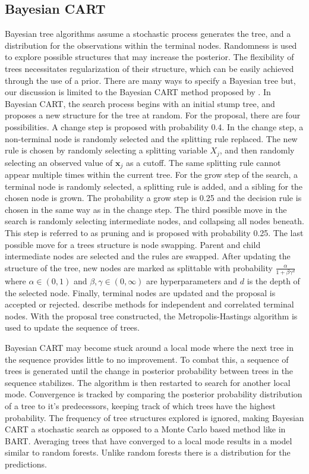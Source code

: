 \documentclass[
  12pt,
  letterpaper,
  DIV=11,
  numbers=noendperiod]{scrartcl}
\newcommand{\bm}{\mathbf}
\begin{document}
\subsection{Bayesian CART}\label{bayesian-cart}

Bayesian tree algorithms assume a stochastic process generates the tree,
and a distribution for the observations within the terminal nodes.
Randomness is used to explore possible structures that may increase the
posterior. The flexibility of trees necessitates regularization of their
structure, which can be easily achieved through the use of a prior.
There are many ways to specify a Bayesian tree but, our discussion is
limited to the Bayesian CART method proposed by \cite{bayes_cart}. In
Bayesian CART, the search process begins with an initial stump tree, and
proposes a new structure for the tree at random. For the proposal, there
are four possibilities. A change step is proposed with probability 0.4.
In the change step, a non-terminal node is randomly selected and the
splitting rule replaced. The new rule is chosen by randomly selecting a
splitting variable \(X_j\), and then randomly selecting an observed
value of \(\bm x_j\) as a cutoff. The same splitting rule cannot appear
multiple times within the current tree. For the grow step of the search,
a terminal node is randomly selected, a splitting rule is added, and a
sibling for the chosen node is grown. The probability a grow step is
0.25 and the decision rule is chosen in the same way as in the change
step. The third possible move in the search is randomly selecting
intermediate nodes, and collapsing all nodes beneath. This step is
referred to as pruning and is proposed with probability 0.25. The last
possible move for a trees structure is node swapping. Parent and child
intermediate nodes are selected and the rules are swapped. After
updating the structure of the tree, new nodes are marked as splittable
with probability \(\frac{\alpha}{1+\beta\gamma^d}\) where
\(\alpha\in(0,1)\) and \(\beta,\gamma\in(0,\infty)\) are hyperparameters
and \(d\) is the depth of the selected node. Finally, terminal nodes are
updated and the proposal is accepted or rejected. \cite{bayes_cart}
describe methods for independent and correlated terminal nodes. With the
proposal tree constructed, the Metropolis-Hastings algorithm is used to
update the sequence of trees.

Bayesian CART may become stuck around a local mode where the next tree
in the sequence provides little to no improvement. To combat this, a
sequence of trees is generated until the change in posterior probability
between trees in the sequence stabilizes. The algorithm is then
restarted to search for another local mode. Convergence is tracked by
comparing the posterior probability distribution of a tree to it's
predecessors, keeping track of which trees have the highest probability.
The frequency of tree structures explored is ignored, making Bayesian
CART a stochastic search as opposed to a Monte Carlo based method like
in BART. Averaging trees that have converged to a local mode results in
a model similar to random forests. Unlike random forests there is a
distribution for the predictions.
\end{document}

